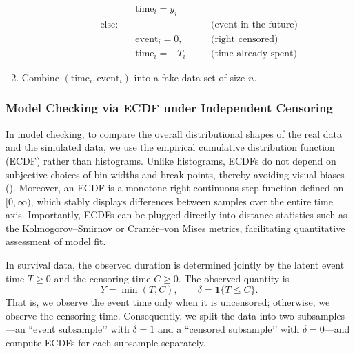 \begin{tcolorbox}
\begin{enumerate}
\begin{enumerate}
\begin{enumerate}
\[\begin{aligned}
  &&\quad \text{time}_i=y_i
   &\quad \\
&\text{else}: &&&\text{(event in the future)}\\
   &&\quad \text{event}_i=0, &&\text{(right censored)}\\ 
   &&\quad \text{time}_i=-T_i &&\text{(time already spent)}
   &\quad 
\end{aligned}\]
          \end{enumerate}
        \end{enumerate}
  \item Combine $(\text{time}_i,\text{event}_i)$ into a fake data set of size $n$.
\end{enumerate}
\label{fake data}
\end{tcolorbox}
\subsubsection{Model Checking via ECDF under Independent Censoring}
In model checking, to compare the overall distributional shapes of the real data and the simulated data, we use the empirical cumulative distribution function (ECDF) rather than histograms. Unlike histograms, ECDFs do not depend on subjective choices of bin widths and break points, thereby avoiding visual biases (\cite{berg2008data}). Moreover, an ECDF is a monotone right-continuous step function defined on $[0,\infty)$, which stably displays differences between samples over the entire time axis. Importantly, ECDFs can be plugged directly into distance statistics such as the Kolmogorov–Smirnov or Cramér–von Mises metrics, facilitating quantitative assessment of model fit.

In survival data, the observed duration is determined jointly by the latent event time $T\ge 0$ and the censoring time $C\ge 0$. The observed quantity is
$$
Y=\min(T,C),\qquad \delta=\mathbf 1\{T\le C\}.
$$
That is, we observe the event time only when it is uncensored; otherwise, we observe the censoring time. Consequently, we split the data into two subsamples—an “event subsample’’ with $\delta=1$ and a “censored subsample’’ with $\delta=0$—and compute ECDFs for each subsample separately.

